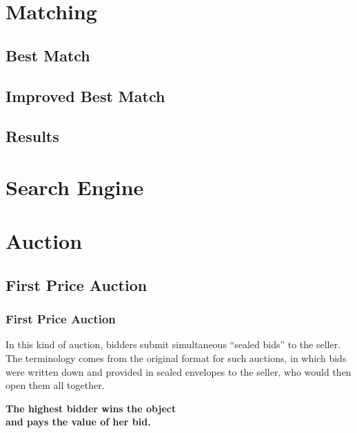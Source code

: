 \documentclass{beamer}
\begin{document}
\section{Matching}
\subsection{Best Match}
\begin{frame}

\end{frame}

\subsection{Improved Best Match}
\begin{frame}

\end{frame}

\subsection{Results}
\begin{frame}

\end{frame}

\section{Search Engine}
\begin{frame}

\end{frame}

\section{Auction}

\subsection{First Price Auction}
\begin{frame}
\frametitle{First Price Auction}
In this kind of auction, bidders submit simultaneous ``sealed bids'' to the seller. The terminology comes from the original format for such auctions, in which bids were written down and provided in sealed envelopes to the seller, who would then open them all together.\\
\medskip
\begin{center}\textbf{The highest bidder wins the object \\ and pays the value of her bid.}\end{center}
\end{frame}
\end{document}
